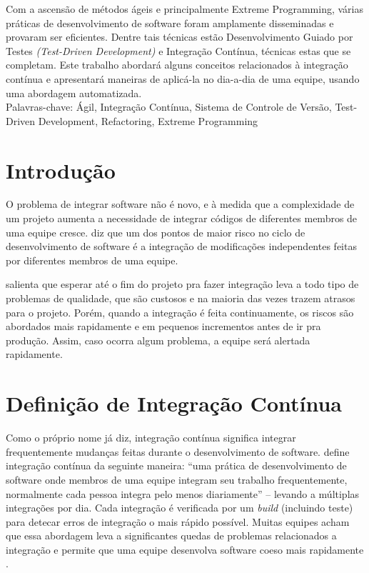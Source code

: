 \documentclass[10pt,a4paper,font=plain]{abnt}
\date{11 de março de 2010}
\begin{document}
\maketitle

\begin{resumo}
Com a ascensão de métodos ágeis e principalmente Extreme Programming, várias práticas de desenvolvimento de software foram amplamente disseminadas e provaram ser eficientes. Dentre tais técnicas estão Desenvolvimento Guiado por Testes \textit{(Test-Driven Development)}  e Integração Contínua, técnicas estas que se completam. Este trabalho abordará alguns conceitos relacionados à integração contínua e apresentará maneiras de aplicá-la no dia-a-dia de uma equipe, usando uma abordagem automatizada.\\

Palavras-chave: Ágil, Integração Contínua, Sistema de Controle de Versão, Test-Driven Development, Refactoring, Extreme Programming
\end{resumo}



\section{Introdução}

O problema de integrar software não é novo, e à medida que a complexidade de um projeto aumenta a necessidade de integrar códigos de diferentes membros de uma equipe cresce.  diz que um dos pontos de maior risco no ciclo de desenvolvimento de software é a integração de modificações independentes feitas por diferentes membros de uma equipe.

 salienta que esperar até o fim do projeto pra fazer integração leva a todo tipo de problemas de qualidade, que são custosos e na maioria das vezes trazem atrasos para o projeto. Porém, quando a integração é feita continuamente, os riscos são abordados mais rapidamente e em pequenos incrementos antes de ir pra produção. Assim, caso ocorra algum problema, a equipe será alertada rapidamente.



\section{Definição de Integração Contínua}

Como o próprio nome já diz, integração contínua significa integrar frequentemente mudanças feitas durante o desenvolvimento de software.
 define integração contínua da seguinte maneira: ``uma prática de desenvolvimento de software onde membros de uma equipe integram seu trabalho frequentemente, normalmente cada pessoa integra pelo menos diariamente'' -- levando a múltiplas integrações por dia. Cada integração é verificada por um \textit{build} (incluindo teste) para detecar erros de integração o mais rápido possível. Muitas equipes acham que essa abordagem leva a significantes quedas de problemas relacionados a integração e permite que uma equipe desenvolva software coeso mais rapidamente \cite{Fowler}.
\end{document}
